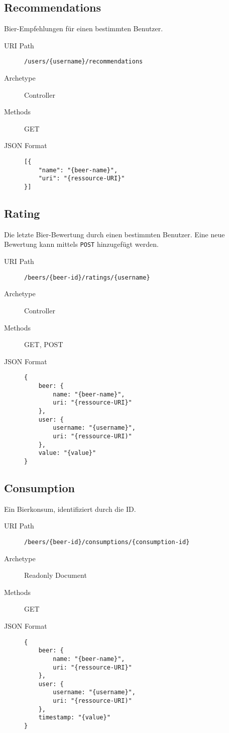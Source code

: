 \documentclass[10pt,a4paper]{scrartcl}
\begin{document}
\subsection{Recommendations}

Bier-Empfehlungen für einen bestimmten Benutzer.

\begin{description}
	\item[URI Path] \texttt{/users/\{username\}/recommendations}
	\item[Archetype] Controller
	\item[Methods] GET
	\item[JSON Format] \hfill
\begin{lstlisting}
[{
	"name": "{beer-name}",
	"uri": "{ressource-URI}"
}]
\end{lstlisting}
\end{description}


\subsection{Rating}

Die letzte Bier-Bewertung durch einen bestimmten Benutzer. Eine neue Bewertung kann mittels \texttt{POST} hinzugefügt werden.

\begin{description}
	\item[URI Path] \texttt{/beers/\{beer-id\}/ratings/\{username\}}
	\item[Archetype] Controller
	\item[Methods] GET, POST
	\item[JSON Format] \hfill
\begin{lstlisting}
{
	beer: {
		name: "{beer-name}",
		uri: "{ressource-URI}"
	},
	user: {
		username: "{username}",
		uri: "{ressource-URI)"
	},
	value: "{value}"
}
	\end{lstlisting}
\end{description}

\subsection{Consumption}

Ein Bierkonsum, identifiziert durch die ID.

\begin{description}
	\item[URI Path] \texttt{/beers/\{beer-id\}/consumptions/\{consumption-id\}}
	\item[Archetype] Readonly Document
	\item[Methods] GET
	\item[JSON Format] \hfill
\begin{lstlisting}
{
	beer: {
		name: "{beer-name}",
		uri: "{ressource-URI}"
	},
	user: {
		username: "{username}",
		uri: "{ressource-URI)"
	},
	timestamp: "{value}"
}
\end{lstlisting}
\end{description}
\end{document}
